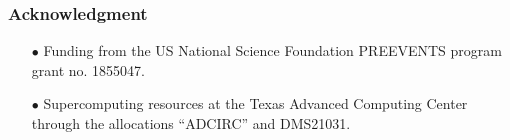 \documentclass[10pt]{oden_beamer}
\begin{document}
\begin{frame}

\frametitle{Acknowledgment}


\begin{itemize}

\item[$\bullet$] Funding from the US National Science Foundation PREEVENTS program grant no. 1855047.

\item[$\bullet$] Supercomputing resources at the Texas Advanced Computing Center through the allocations “ADCIRC” and DMS21031.

\end{itemize}

\begin{figure}

    \centering


\end{figure}

\begin{figure}

    \centering


\end{figure}



\end{frame}
\end{document}

